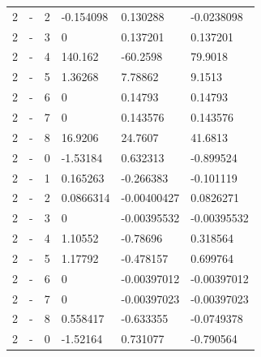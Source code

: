 \begin{longtable}
{}2 & \allowbreak{}-\allowbreak{} & 2 & -0.154098 & 0.130288 & -0.0238098 \\
{}2 & \allowbreak{}-\allowbreak{} & 3 & 0 & 0.137201 & 0.137201 \\
{}2 & \allowbreak{}-\allowbreak{} & 4 & 140.162 & -60.2598 & 79.9018 \\
{}2 & \allowbreak{}-\allowbreak{} & 5 & 1.36268 & 7.78862 & 9.1513 \\
{}2 & \allowbreak{}-\allowbreak{} & 6 & 0 & 0.14793 & 0.14793 \\
{}2 & \allowbreak{}-\allowbreak{} & 7 & 0 & 0.143576 & 0.143576 \\
{}2 & \allowbreak{}-\allowbreak{} & 8 & 16.9206 & 24.7607 & 41.6813 \\
{}2 & \allowbreak{}-\allowbreak{} & 0 & -1.53184 & 0.632313 & -0.899524 \\
{}2 & \allowbreak{}-\allowbreak{} & 1 & 0.165263 & -0.266383 & -0.101119 \\
{}2 & \allowbreak{}-\allowbreak{} & 2 & 0.0866314 & -0.00400427 & 0.0826271 \\
{}2 & \allowbreak{}-\allowbreak{} & 3 & 0 & -0.00395532 & -0.00395532 \\
{}2 & \allowbreak{}-\allowbreak{} & 4 & 1.10552 & -0.78696 & 0.318564 \\
{}2 & \allowbreak{}-\allowbreak{} & 5 & 1.17792 & -0.478157 & 0.699764 \\
{}2 & \allowbreak{}-\allowbreak{} & 6 & 0 & -0.00397012 & -0.00397012 \\
{}2 & \allowbreak{}-\allowbreak{} & 7 & 0 & -0.00397023 & -0.00397023 \\
{}2 & \allowbreak{}-\allowbreak{} & 8 & 0.558417 & -0.633355 & -0.0749378 \\
{}2 & - & 0 & -1.52164 & 0.731077 & -0.790564 \\

\end{longtable}
